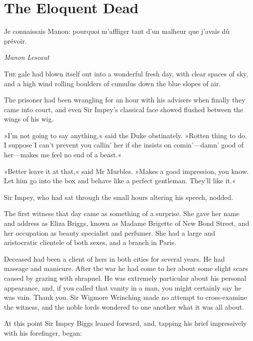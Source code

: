 

\chapter{The Eloquent Dead}

\epigraph{\begin{french}Je connaissais Manon: pourquoi m'affliger tant d'un malheur que j'avais dû prévoir.\end{french}}{\textit{Manon Lescaut}}




\lettrine[lines=4]{T}{he} gale had blown itself out into a wonderful fresh day, with clear
spaces of sky, and a high wind rolling boulders of cumulus down the
blue slopes of air.

The prisoner had been wrangling for an hour with his advisers when
finally they came into court, and even Sir Impey's classical face
showed flushed between the wings of his wig.

»I'm not going to say anything,« said the Duke obstinately. »Rotten
thing to do. I suppose I can't prevent you callin' her if she insists
on comin'---damn' good of her\allowbreak---\allowbreak makes me feel no end of a beast.«

»Better leave it at that,« said Mr Murbles. »Makes a good impression,
you know. Let him go into the box and behave like a perfect gentleman.
They'll like it.«

Sir Impey, who had sat through the small hours altering his speech,
nodded.

The first witness that day came as something of a surprise. She gave
her name and address as Eliza Briggs, known as Madame Brigette of New
Bond Street, and her occupation as beauty specialist and perfumer. She
had a large and aristocratic clientele of both sexes, and a branch in
Paris.

Deceased had been a client of hers in both cities for several years.
He had massage and manicure. After the war he had come to her about
some slight scars caused by grazing with shrapnel. He was extremely
particular about his personal appearance, and, if you called that
vanity in a man, you might certainly say he was vain. Thank you. Sir
Wigmore Wrinching made no attempt to cross-examine the witness, and the
noble lords wondered to one another what it was all about.

At this point Sir Impey Biggs leaned forward, and, tapping his brief
impressively with his forefinger, began:

